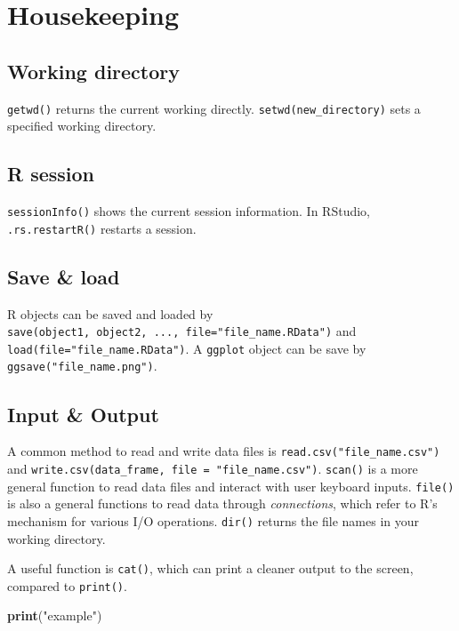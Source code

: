 \documentclass[]{book}
\newenvironment{Shaded}{\begin{snugshade}}{\end{snugshade}}
\newcommand{\KeywordTok}[1]{\textcolor[rgb]{0.13,0.29,0.53}{\textbf{{#1}}}}
\newcommand{\StringTok}[1]{\textcolor[rgb]{0.31,0.60,0.02}{{#1}}}
\newcommand{\NormalTok}[1]{{#1}}
\theoremstyle{definition}
\theoremstyle{definition}
\theoremstyle{remark}
\begin{document}
\section{Housekeeping}\label{housekeeping}

\subsection{Working directory}\label{working-directory}

\texttt{getwd()} returns the current working directly.
\texttt{setwd(new\_directory)} sets a specified working directory.

\subsection{R session}\label{r-session}

\texttt{sessionInfo()} shows the current session information. In
RStudio, \texttt{.rs.restartR()} restarts a session.

\subsection{Save \& load}\label{save-load}

R objects can be saved and loaded by
\texttt{save(object1,\ object2,\ ...,\ file="file\_name.RData")} and
\texttt{load(file="file\_name.RData")}. A \texttt{ggplot} object can be
save by \texttt{ggsave("file\_name.png")}.

\subsection{Input \& Output}\label{input-output}

A common method to read and write data files is
\texttt{read.csv("file\_name.csv")} and
\texttt{write.csv(data\_frame,\ file\ =\ "file\_name.csv")}.
\texttt{scan()} is a more general function to read data files and
interact with user keyboard inputs. \texttt{file()} is also a general
functions to read data through \emph{connections}, which refer to R's
mechanism for various I/O operations. \texttt{dir()} returns the file
names in your working directory.

A useful function is \texttt{cat()}, which can print a cleaner output to
the screen, compared to \texttt{print()}.

\begin{Shaded}
\begin{Highlighting}[]
\KeywordTok{print}\NormalTok{(}\StringTok{"example"}\NormalTok{)}
\end{Highlighting}
\end{Shaded}
\end{document}
